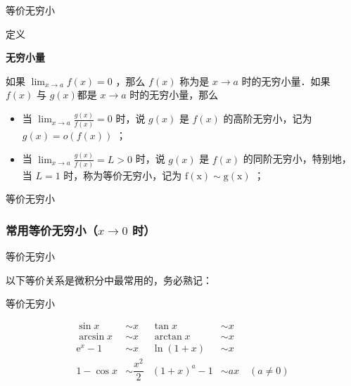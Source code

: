 \documentclass[aspectratio=169,10pt,fontset=fandol]{ctexbeamer}
\newcommand{\ee}{\mathrm{e}}
\begin{document}
\begin{frame}[t,fragile]{等价无穷小}
\footnotesize
\begin{block}{定义}
{\footnotesize
\textbf{无穷小量}\par

	如果 $\lim _{x \rightarrow a} f(x)=0$ ，那么 $f(x)$ 称为是 $x \rightarrow a$ 时的无穷小量．如果 $f(x)$ 与 $g(x)$都是 $x \rightarrow a$ 时的无穷小量，那么
	\begin{itemize}
		\item[1．] 当 $\lim _{x \rightarrow a} \frac{g(x)}{f(x)}=0$ 时，说 $g(x)$ 是 $f(x)$ 的高阶无穷小，记为 $g(x)=o(f(x))$ ；
		\item[2．] 当 $\lim _{x \rightarrow a} \frac{g(x)}{f(x)}=L>0$ 时，说 $g(x)$ 是 $f(x)$ 的同阶无穷小，特别地，当 $L=1$ 时，称为等价无穷小，记为 $\mathrm{f}(\mathrm{x}) \sim \mathrm{g}(\mathrm{x})$ ；
	\end{itemize}


}
\end{block}
\end{frame}
\begin{frame}[t,fragile]{等价无穷小}
\footnotesize
{\footnotesize
\subsubsection{\texorpdfstring{常用等价无穷小（\(x \to 0\) 时）}{常用等价无穷小（x 趋于 0 时）}}


}
\end{frame}
\begin{frame}[t,fragile]{等价无穷小}
\footnotesize
{\footnotesize
以下等价关系是微积分中最常用的，务必熟记：


}
\end{frame}
\begin{frame}[t,fragile]{等价无穷小}
\footnotesize
{\footnotesize
\[
\boxed{
\begin{aligned}
\sin x &\sim x & \tan x &\sim x \\
\arcsin x &\sim x & \arctan x &\sim x \\
\ee^x - 1 &\sim x & \ln(1+x) &\sim x \\
1 - \cos x &\sim \dfrac{x^2}{2} & (1+x)^a - 1 &\sim ax \quad (a \neq 0)
\end{aligned}
}
\]


}
\end{frame}
\end{document}
